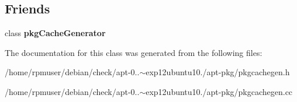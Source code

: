\subsection*{\-Friends}
\begin{DoxyCompactItemize}
\item 
class {\bfseries pkg\-Cache\-Generator}\label{classpkgCacheGenerator_1_1ListParser_a6490b678234fceca3f2391d055076b60}

\end{DoxyCompactItemize}


\-The documentation for this class was generated from the following files\-:\begin{DoxyCompactItemize}
\item 
/home/rpmuser/debian/check/apt-\/0..$\sim$exp12ubuntu10./apt-\/pkg/pkgcachegen.\-h\item 
/home/rpmuser/debian/check/apt-\/0..$\sim$exp12ubuntu10./apt-\/pkg/pkgcachegen.\-cc\end{DoxyCompactItemize}
